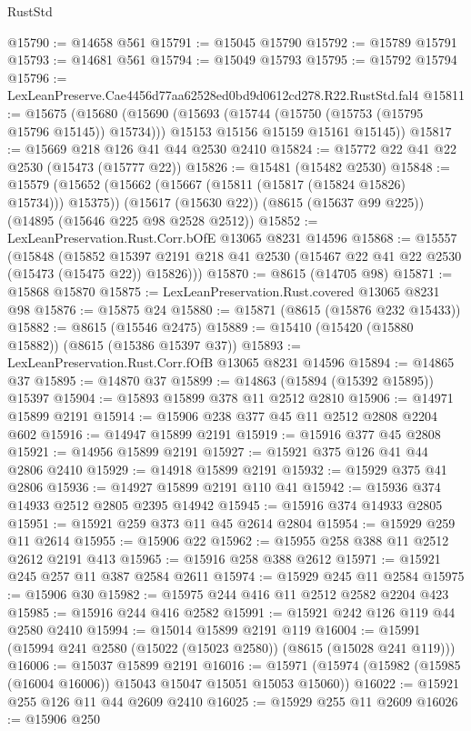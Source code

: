 \begin{lexlean}{RustStd}
\begin{coremodule}
@15790 := @14658 @561
@15791 := @15045 @15790
@15792 := @15789 @15791
@15793 := @14681 @561
@15794 := @15049 @15793
@15795 := @15792 @15794
@15796 := LexLeanPreserve.Cae4456d77aa62528ed0bd9d0612cd278.R22.RustStd.fal4
@15811 := @15675
    (@15680
      (@15690
        (@15693 (@15744 (@15750 (@15753 (@15795 @15796 @15145)) @15734)))
        @15153
        @15156
        @15159
        @15161
        @15145))
@15817 := @15669 @218 @126 @41 @44 @2530 @2410
@15824 := @15772 @22 @41 @22 @2530 (@15473 (@15777 @22))
@15826 := @15481 (@15482 @2530)
@15848 := @15579
    (@15652 (@15662 (@15667 (@15811 (@15817 (@15824 @15826) @15734))) @15375))
    (@15617 (@15630 @22))
    (@8615 (@15637 @99 @225))
    (@14895 (@15646 @225 @98 @2528 @2512))
@15852 := LexLeanPreservation.Rust.Corr.bOfE @13065 @8231 @14596
@15868 := @15557
    (@15848
      (@15852 @15397 @2191 @218 @41 @2530 (@15467 @22 @41 @22 @2530 (@15473 (@15475 @22)) @15826)))
@15870 := @8615 (@14705 @98)
@15871 := @15868 @15870
@15875 := LexLeanPreservation.Rust.covered @13065 @8231 @98
@15876 := @15875 @24
@15880 := @15871 (@8615 (@15876 @232 @15433))
@15882 := @8615 (@15546 @2475)
@15889 := @15410 (@15420 (@15880 @15882)) (@8615 (@15386 @15397 @37))
@15893 := LexLeanPreservation.Rust.Corr.fOfB @13065 @8231 @14596
@15894 := @14865 @37
@15895 := @14870 @37
@15899 := @14863 (@15894 (@15392 @15895)) @15397
@15904 := @15893 @15899 @378 @11 @2512 @2810
@15906 := @14971 @15899 @2191
@15914 := @15906 @238 @377 @45 @11 @2512 @2808 @2204 @602
@15916 := @14947 @15899 @2191
@15919 := @15916 @377 @45 @2808
@15921 := @14956 @15899 @2191
@15927 := @15921 @375 @126 @41 @44 @2806 @2410
@15929 := @14918 @15899 @2191
@15932 := @15929 @375 @41 @2806
@15936 := @14927 @15899 @2191 @110 @41
@15942 := @15936 @374 @14933 @2512 @2805 @2395 @14942
@15945 := @15916 @374 @14933 @2805
@15951 := @15921 @259 @373 @11 @45 @2614 @2804
@15954 := @15929 @259 @11 @2614
@15955 := @15906 @22
@15962 := @15955 @258 @388 @11 @2512 @2612 @2191 @413
@15965 := @15916 @258 @388 @2612
@15971 := @15921 @245 @257 @11 @387 @2584 @2611
@15974 := @15929 @245 @11 @2584
@15975 := @15906 @30
@15982 := @15975 @244 @416 @11 @2512 @2582 @2204 @423
@15985 := @15916 @244 @416 @2582
@15991 := @15921 @242 @126 @119 @44 @2580 @2410
@15994 := @15014 @15899 @2191 @119
@16004 := @15991 (@15994 @241 @2580 (@15022 (@15023 @2580)) (@8615 (@15028 @241 @119)))
@16006 := @15037 @15899 @2191
@16016 := @15971 (@15974 (@15982 (@15985 (@16004 @16006)) @15043 @15047 @15051 @15053 @15060))
@16022 := @15921 @255 @126 @11 @44 @2609 @2410
@16025 := @15929 @255 @11 @2609
@16026 := @15906 @250

\end{coremodule}
\end{lexlean}

